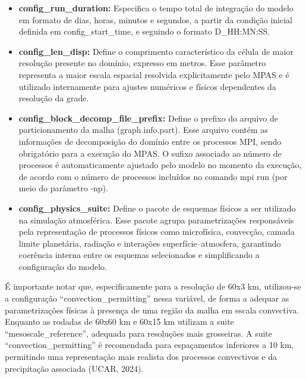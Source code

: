 \documentclass[12pt,a4paper,oneside]{book}
\begin{document}
\begin{itemize}
\item
  \textbf{config\_run\_duration:} Especifica o tempo total de integração do modelo em formato de dias, horas, minutos e segundos, a partir da condição inicial definida em config\_start\_time, e seguindo o formato \textquotesingle D\_HH:MN:SS\textquotesingle.
\item
  \textbf{config\_len\_disp:} Define o comprimento característico da célula de maior resolução presente no domínio, expresso em metros. Esse parâmetro representa a maior escala espacial resolvida explicitamente pelo MPAS e é utilizado internamente para ajustes numéricos e físicos dependentes da resolução da grade.
\item
  \textbf{config\_block\_decomp\_file\_prefix:} Define o prefixo do arquivo de particionamento da malha (graph.info.part). Esse arquivo contém as informações de decomposição do domínio entre os processos MPI, sendo obrigatório para a execução do MPAS. O sufixo associado ao número de processos é automaticamente ajustado pelo modelo no momento da execução, de acordo com o número de processos incluídos no comando mpi run (por meio do parâmetro -np).
\item
  \textbf{config\_physics\_suite:} Define o pacote de esquemas físicos a ser utilizado na simulação atmosférica. Esse pacote agrupa parametrizações responsáveis pela representação de processos físicos como microfísica, convecção, camada limite planetária, radiação e interações superfície--atmosfera, garantindo coerência interna entre os esquemas selecionados e simplificando a configuração do modelo.
\end{itemize}

É importante notar que, especificamente para a resolução de 60x3 km, utilizou-se a configuração ``convection\_permitting'' nessa variável, de forma a adequar as parametrizações físicas à presença de uma região da malha em escala convectiva. Enquanto as rodadas de 60x60 km e 60x15 km utilizam a suite ``mesoscale\_reference'', adequada para resoluções mais grosseiras. A suite ``convection\_permitting'' é recomendada para espaçamentos inferiores a 10 km, permitindo uma representação mais realista dos processos convectivos e da precipitação associada (UCAR, 2024).
\end{document}
